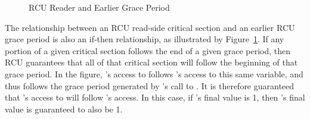 \begin{figure}[tbp]
\centering
{}
\caption{RCU Reader and Earlier Grace Period}
\label{fig:defer:RCU Reader and Earlier Grace Period}
\end{figure}

The relationship between an RCU read-side critical section and an earlier
RCU grace period is also an if-then relationship, as illustrated by
Figure~\ref{fig:defer:RCU Reader and Earlier Grace Period}.
If any portion of a given critical section follows the end of
a given grace period, then RCU guarantees that all of that critical
section will follow the beginning of that grace period.
In the figure, 's access to  follows 's access
to this same variable, and thus follows the grace period generated by
's call to .
It is therefore guaranteed that 's access to  will follow
's access.  In this case, if 's final value is 1, then
's final value is guaranteed to also be 1.

\QuickQuizEnd

